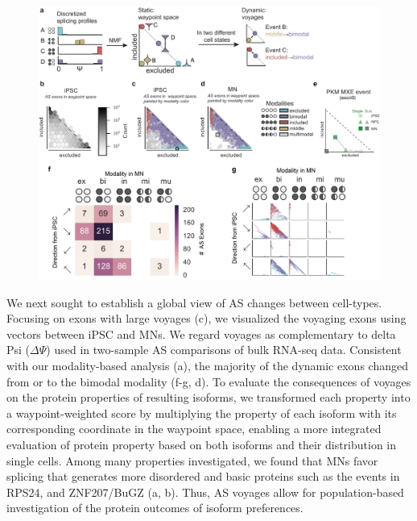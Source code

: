 \clearpage
\begin{figure}[h]
\ContinuedFloat
\captionsetup{labelformat=empty}
\centering
\includegraphics[width=5.8in]{figures/bonvoyage_overview.pdf}
\end{figure}
\addtocounter{figure}{1}
\clearpage

We next sought to establish a global view of AS changes between cell-types. Focusing on exons with large voyages (c), we visualized the voyaging exons using vectors between iPSC and MNs. We regard voyages as complementary to delta Psi ($\Delta\Psi$) used in two-sample AS comparisons of bulk RNA-seq data. Consistent with our modality-based analysis (a), the majority of the dynamic exons changed from or to the bimodal modality (f-g, d). To evaluate the consequences of voyages on the protein properties of resulting isoforms, we transformed each property into a waypoint-weighted score by multiplying the property of each isoform with its corresponding coordinate in the waypoint space, enabling a more integrated evaluation of protein property based on both isoforms and their distribution in single cells. Among many properties investigated, we found that MNs favor splicing that generates more disordered and basic proteins such as the events in RPS24, and ZNF207/BuGZ (a, b). Thus, AS voyages allow for population-based investigation of the protein outcomes of isoform preferences.



